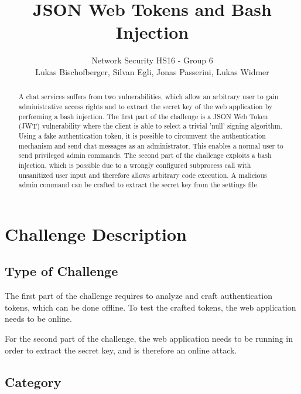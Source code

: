 \documentclass[12pt,a4paper]{article}
\title{JSON Web Tokens and Bash Injection} %
\author{Network Security HS16 - Group 6\\Lukas Bischofberger, Silvan Egli, Jonas Passerini, Lukas Widmer}
\begin{document}
\maketitle

\begin{abstract}

A chat services suffers from two vulnerabilities, which allow an arbitrary user to gain administrative access rights and to extract the secret key of the web application by performing a bash injection.
The first part of the challenge is a JSON Web Token (JWT) vulnerability where the client is able to select a trivial 'null' signing algorithm. Using a fake authentication token, it is possible to circumvent the authentication mechanism and send chat messages as an administrator. This enables a normal user to send privileged admin commands.
The second part of the challenge exploits a bash injection, which is possible due to a wrongly configured subprocess call with unsanitized user input and therefore allows arbitrary code execution. A malicious admin command can be crafted to extract the secret key from the settings file.

\end{abstract}

\section{Challenge Description}

\subsection{Type of Challenge}

The first part of the challenge requires to analyze and craft authentication tokens, which can be done offline. To test the crafted tokens, the web application needs to be online.

For the second part of the challenge, the web application needs to be running in order to extract the secret key, and is therefore an online attack.


\subsection{Category}
\end{document}
